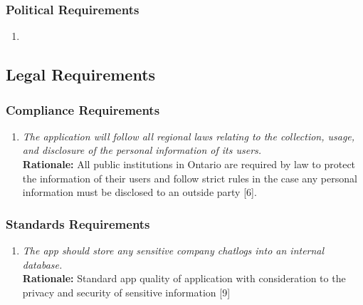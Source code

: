 \documentclass[]{article}
\begin{document}
\begin{enumerate}[{\bf BE1.}]
\subsubsection{Political Requirements}
\label{ssub:political_requirements}
\begin{enumerate}[{N/A}]
    \item 
\end{enumerate}




\subsection{Legal Requirements}
\label{sub:legal_requirements}


\subsubsection{Compliance Requirements}
\label{ssub:compliance_requirements}
\begin{enumerate}[{LR-COMP}1. ]
    \item \emph{The application will follow all regional laws relating to the collection, usage, and disclosure of the personal information of its users.}\\
    {\bf Rationale:} All public institutions in Ontario are required by law to protect the information of their users and follow strict rules in the case any personal information must be disclosed to an outside party [6].
\end{enumerate}


\subsubsection{Standards Requirements}
\label{ssub:standards_requirements}
\begin{enumerate}[{LR-STD}1. ]
    \item \emph{The app should store any sensitive company chatlogs into an internal database.}\\
    {\bf Rationale:} Standard app quality of application with consideration to the privacy and security of sensitive information [9]
\end{enumerate}







\end{enumerate}
\end{document}
